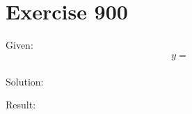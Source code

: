 \documentclass[a4paper, 10pt]{scrartcl}
\begin{document}
\section{Exercise 900}

Given:
\[
y = \frac{}{}
\]

Solution:

Result:
\end{document}
